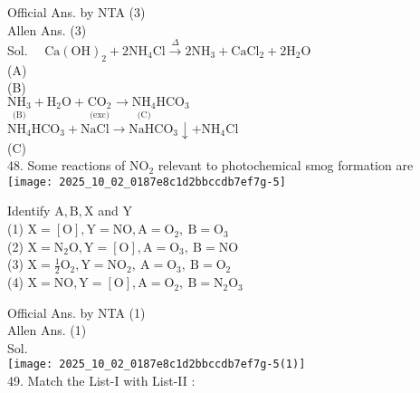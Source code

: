 \documentclass[10pt]{article}
\begin{document}
Official Ans. by NTA (3)\\
Allen Ans. (3)\\
Sol. \(\quad \mathrm{Ca}(\mathrm{OH})_{2}+2 \mathrm{NH}_{4} \mathrm{Cl} \xrightarrow{\Delta} 2 \mathrm{NH}_{3}+\mathrm{CaCl}_{2}+2 \mathrm{H}_{2} \mathrm{O}\)\\
(A)\\
(B)\\
\(\underset{\text { (B) }}{\mathrm{NH}_{3}}+\mathrm{H}_{2} \mathrm{O}+\underset{\text { (exc) }}{\mathrm{CO}_{2}} \longrightarrow \underset{\text { (C) }}{\mathrm{NH}_{4}} \mathrm{HCO}_{3}\)\\
\(\mathrm{NH}_{4} \mathrm{HCO}_{3}+\mathrm{NaCl} \longrightarrow \mathrm{NaHCO}_{3} \downarrow+\mathrm{NH}_{4} \mathrm{Cl}\)\\
(C)\\
48. Some reactions of \(\mathrm{NO}_{2}\) relevant to photochemical smog formation are\\
\texttt{[image: 2025\_10\_02\_0187e8c1d2bbccdb7ef7g-5]}

Identify \(\mathrm{A}, \mathrm{B}, \mathrm{X}\) and Y\\
(1) \(\mathrm{X}=[\mathrm{O}], \mathrm{Y}=\mathrm{NO}, \mathrm{A}=\mathrm{O}_{2}, \mathrm{~B}=\mathrm{O}_{3}\)\\
(2) \(\mathrm{X}=\mathrm{N}_{2} \mathrm{O}, \mathrm{Y}=[\mathrm{O}], \mathrm{A}=\mathrm{O}_{3}, \mathrm{~B}=\mathrm{NO}\)\\
(3) \(\mathrm{X}=\frac{1}{2} \mathrm{O}_{2}, \mathrm{Y}=\mathrm{NO}_{2}, \mathrm{~A}=\mathrm{O}_{3}, \mathrm{~B}=\mathrm{O}_{2}\)\\
(4) \(\mathrm{X}=\mathrm{NO}, \mathrm{Y}=[\mathrm{O}], \mathrm{A}=\mathrm{O}_{2}, \mathrm{~B}=\mathrm{N}_{2} \mathrm{O}_{3}\)

Official Ans. by NTA (1)\\
Allen Ans. (1)\\
Sol.\\
\texttt{[image: 2025\_10\_02\_0187e8c1d2bbccdb7ef7g-5(1)]}\\
49. Match the List-I with List-II :
\end{document}
